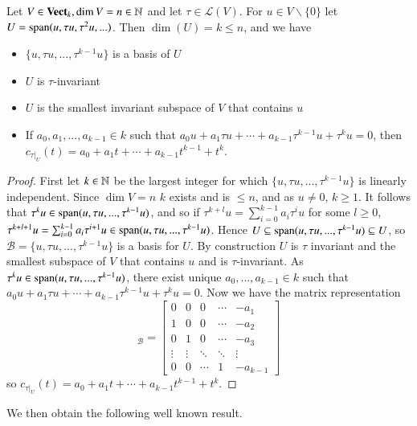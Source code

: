 \begin{theorem}
    Let $V \in \normalfont\textbf{Vect}_{k}, \dim V = n\in\mathbb N$ and let $\tau \in \mathcal{L}(V)$. For $u \in V\backslash\{0\}$ let $U = \operatorname{span}(u,\tau u,\tau^2u,...)$. Then $\dim(U) = k \leq n$, and we have \begin{itemize}
        \item $\{u,\tau u,...,\tau^{k-1}u\}$ is a basis of $U$
        \item $U$ is $\tau$-invariant
        \item $U$ is the smallest invariant subspace of $V$ that contains $u$
        \item If $a_0,a_1,...,a_{k-1} \in k$ such that $a_0u+a_1\tau u+\cdots +a_{k-1}\tau^{k-1}u+\tau^ku = 0$, then $c_{\tau\vert_U}(t) = a_0+a_1t+\cdots+a_{k-1}t^{k-1}+t^k$.
    \end{itemize}
\end{theorem}
\begin{proof}
    First let $k\in \mathbb N$ be the largest integer for which $\{u,\tau u,...,\tau^{k-1}u\}$ is linearly independent. Since $\dim V = n$ $k$ exists and is $\leq n$, and as $u\neq 0$, $k \geq 1$. It follows that $\tau^ku \in \operatorname{span}(u,\tau u,...,\tau^{k-1}u)$, and so if $\tau^{k+l}u = \sum_{i=0}^{k-1}a_i\tau^iu$ for some $l \geq 0$, $\tau^{k+l+1}u = \sum_{i=0}^{k-1}a_i\tau^{i+1}u \in \operatorname{span}(u,\tau u,...,\tau^{k-1}u)$. Hence $U \subseteq \operatorname{span}(u,\tau u,...,\tau^{k-1}u)\subseteq U$, so $\mathcal{B} = \{u,\tau u,...,\tau^{k-1}u\}$ is a basis for $U$. By construction $U$ is $\tau$ invariant and the smallest subspace of $V$ that contains $u$ and is $\tau$-invariant. As $\tau^ku \in \operatorname{span}(u,\tau u,...,\tau^{k-1}u)$, there exist unique $a_0,...,a_{k-1} \in k$ such that $a_0u+a_1\tau u+\cdots +a_{k-1}\tau^{k-1}u + \tau^ku = 0$. Now we have the matrix representation \begin{equation*}
        [\tau\vert_U]_{\mathcal{B}} = \begin{bmatrix} 0 & 0 & 0 & \cdots & -a_1 \\ 1 & 0 & 0 & \cdots & -a_2 \\ 0 & 1 & 0 & \cdots & -a_3 \\ \vdots & \vdots & \ddots & \ddots & \vdots \\ 0 & 0 & \cdots & 1 & -a_{k-1} \end{bmatrix}
    \end{equation*}
    so $c_{\tau\vert_U}(t) = a_0+a_1t+\cdots+a_{k-1}t^{k-1}+t^k$.
\end{proof}

We then obtain the following well known result.

